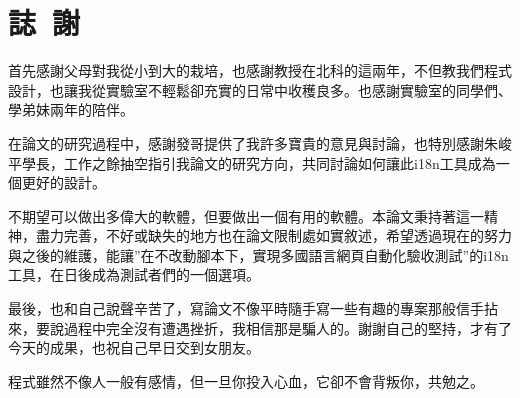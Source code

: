 \chapter*{誌~謝~}

首先感謝父母對我從小到大的栽培，也感謝教授在北科的這兩年，不但教我們程式設計，也讓我從實驗室不輕鬆卻充實的日常中收穫良多。也感謝實驗室的同學們、學弟妹兩年的陪伴。

在論文的研究過程中，感謝發哥提供了我許多寶貴的意見與討論，也特別感謝朱峻平學長，工作之餘抽空指引我論文的研究方向，共同討論如何讓此i18n工具成為一個更好的設計。

不期望可以做出多偉大的軟體，但要做出一個有用的軟體。本論文秉持著這一精神，盡力完善，不好或缺失的地方也在論文限制處如實敘述，希望透過現在的努力與之後的維護，能讓”在不改動腳本下，實現多國語言網頁自動化驗收測試”的i18n工具，在日後成為測試者們的一個選項。

最後，也和自己說聲辛苦了，寫論文不像平時隨手寫一些有趣的專案那般信手拈來，要說過程中完全沒有遭遇挫折，我相信那是騙人的。謝謝自己的堅持，才有了今天的成果，也祝自己早日交到女朋友。

程式雖然不像人一般有感情，但一旦你投入心血，它卻不會背叛你，共勉之。

